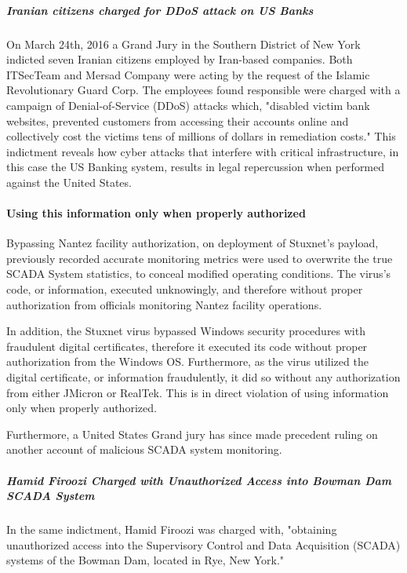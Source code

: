 \documentclass[12pt]{article}
\begin{document}
\begin{multicols}{2}
\subparagraph{Iranian citizens charged for DDoS attack on US Banks}

On March 24th, 2016 a Grand Jury in the Southern District of New York indicted seven Iranian citizens employed by Iran-based companies. Both ITSecTeam and Mersad Company were acting by the request of the Islamic Revolutionary Guard Corp. The employees found responsible were charged with a campaign of Denial-of-Service (DDoS) attacks which, "disabled victim bank websites, prevented customers from accessing their accounts online and collectively cost the victims tens of millions of dollars in remediation costs."\cite{sevenIraniansIndicted} This indictment reveals how cyber attacks that interfere with critical infrastructure, in this case the US Banking system, results in legal repercussion when performed against the United States.

\paragraph{Using this information only when properly authorized}

Bypassing Nantez facility authorization, on deployment of Stuxnet's payload, previously recorded accurate monitoring metrics were used to overwrite the true SCADA System statistics, to conceal modified operating conditions.\cite{theRealStoryOfStuxnet} The virus's code, or information, executed unknowingly, and therefore without proper authorization from officials monitoring Nantez facility operations.

In addition, the Stuxnet virus bypassed Windows security procedures with fraudulent digital certificates, therefore it executed its code without proper authorization from the Windows OS. Furthermore, as the virus utilized the digital certificate, or information fraudulently, it did so without any authorization from either JMicron or RealTek.\cite{signedUsingCertificates} This is in direct violation of using information only when properly authorized.

Furthermore, a United States Grand jury has since made precedent ruling on another account of malicious SCADA system monitoring.

\subparagraph{Hamid Firoozi Charged with Unauthorized Access into Bowman Dam SCADA System}

In the same indictment, Hamid Firoozi was charged with, "obtaining unauthorized access into the Supervisory Control and Data Acquisition (SCADA) systems of the Bowman Dam, located in Rye, New York."\cite{sevenIraniansIndicted}


\end{multicols}
\end{document}

